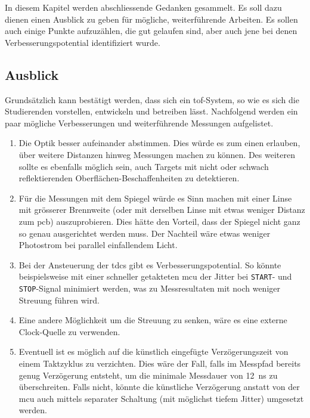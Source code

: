 In diesem Kapitel werden abschliessende Gedanken gesammelt. Es soll dazu dienen einen Ausblick zu geben für mögliche,
weiterführende Arbeiten. Es sollen auch einige Punkte aufzuzählen, die gut gelaufen sind, aber auch jene bei denen
Verbesserungspotential identifiziert wurde.

\subsection{Ausblick}\label{sec:ausblick}

Grundsätzlich kann bestätigt werden, dass sich ein \acrshort{tof}-System, so wie es sich die Studierenden vorstellen,
entwickeln und betreiben lässt. Nachfolgend werden ein paar mögliche Verbesserungen und weiterführende Messungen
aufgelistet.

\begin{enumerate}
    \item Die Optik besser aufeinander abstimmen. Dies würde es zum einen erlauben, über weitere Distanzen hinweg
          Messungen machen zu können. Des weiteren sollte es ebenfalls möglich sein, auch Targets mit nicht oder schwach
          reflektierenden Oberflächen-Beschaffenheiten zu detektieren.
    \item Für die Messungen mit dem Spiegel würde es Sinn machen mit einer Linse mit grösserer Brennweite (oder mit
          derselben Linse mit etwas weniger Distanz zum \acrshort{pcb}) auszuprobieren. Dies hätte den Vorteil, dass der
          Spiegel nicht ganz so genau ausgerichtet werden muss. Der Nachteil wäre etwas weniger Photostrom bei parallel
          einfallendem Licht.
    \item Bei der Ansteuerung der \acrshort{tdc}s gibt es Verbesserungspotential. So könnte beispielsweise mit einer
          schneller getakteten \acrshort{mcu} der Jitter bei \lstinline|START|- und \lstinline|STOP|-Signal minimiert
          werden, was zu Messresultaten mit noch weniger Streuung führen wird.
    \item Eine andere Möglichkeit um die Streuung zu senken, wäre es eine externe Clock-Quelle zu verwenden.
    \item Eventuell ist es möglich auf die künstlich eingefügte Verzögerungszeit von einem Taktzyklus zu verzichten.
          Dies wäre der Fall, falls im Messpfad bereits genug Verzögerung entsteht, um die minimale Messdauer von 12~ns
          zu überschreiten. Falls nicht, könnte die künstliche Verzögerung anstatt von der \acrshort{mcu} auch mittels
          separater Schaltung (mit möglichst tiefem Jitter) umgesetzt werden.

\end{enumerate}
